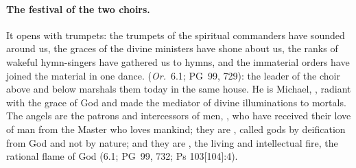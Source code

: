 \paragraph{The festival of the two choirs.} It opens with trumpets: the
trumpets of the spiritual commanders have sounded around us, the graces of
the divine ministers have shone about us, the ranks of wakeful hymn-singers
have gathered us to hymns, and the immaterial orders have joined the
material in one dance.  (\emph{Or.}\ 6.1; PG~99,
729): the leader of the choir above and below marshals them today in the
same house. He is Michael, , radiant with the grace
of God and made the mediator of divine illuminations to mortals. The angels
are the patrons and intercessors of men, , who
have received their love of man from the Master who loves mankind; they are
, called
gods by deification from God and not by nature; and they are , the living and
intellectual fire, the rational flame of God (6.1; PG~99, 732; Ps
103[104]:4).

